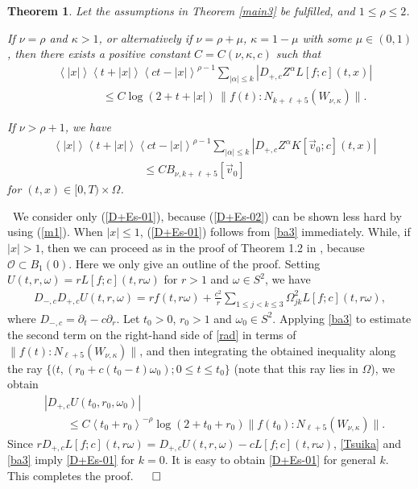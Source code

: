 \documentclass[12pt]{amsart}
\newcommand{\pa}{\partial}
\newcommand{\jb}[1]{\left\langle #1 \right\rangle}
\newcommand{\norm}[2]{\|#1 \!:\! #2\|}
\newtheorem{theorem}{Theorem}[section]
\numberwithin{equation}{section}
\begin{document}
\vspace{2mm}


\begin{theorem}\label{D+Es}
Let the assumptions in Theorem {\rm \ref{main3}} be fulfilled,
and $1\le \rho\le 2$. 

If $\nu=\rho$ and $\kappa>1$, or
alternatively if $\nu=\rho+\mu$, $\kappa=1-\mu$ with some $\mu\in (0,1)$,
then there exists a positive constant $C=C(\nu,\kappa,c)$ such that
\begin{align}
\label{D+Es-01}
& \jb{|x|} \jb{t+|x|} \jb{ct-|x|}^{\rho-1} 
\sum_{|\alpha|\le k} |D_{+,c}Z^\alpha L[f;c](t,x)|
\\
& \qquad\qquad \le C \log(2+t+|x|)\,\|f(t)\!:\!{N_{k+\ell+5}(W_{\nu,\kappa})}\|.
\nonumber
\end{align}

If $\nu>\rho+1$, we have
\begin{align}
\label{D+Es-02}
& \jb{|x|} \jb{t+|x|} \jb{ct-|x|}^{\rho-1} 
\sum_{|\alpha|\le k} |D_{+,c}Z^\alpha K[\vec{v}_0;c](t,x)|
\\
\nonumber
& \qquad\qquad\qquad\qquad \le C B_{\nu, k+\ell+5}[\vec{v}_0]
\end{align}
for $(t,x)\in [0,T)\times \Omega$.
\end{theorem}
\ 
We consider only (\ref{D+Es-01}), because (\ref{D+Es-02}) can be shown
less hard by using (\ref{m1}).
When $|x| \le 1$, (\ref{D+Es-01}) follows from %
\eqref{ba3} immediately.
While, if $|x|>1$, then we can proceed as in the proof of Theorem 1.2 in \cite{KaKu07},
because ${\mathcal O} \subset B_1(0)$. Here we only give an outline
of the proof.
Setting $U(t, r, \omega)=rL[f; c](t, r\omega)$ for $r>1$ and $\omega\in S^2$,
we have
\begin{align}
 D_{-,c}D_{+,c} U(t,r,\omega)=rf(t,r\omega)
 {}+\frac{c^2}{r}\sum_{1\le j<k\le 3} \Omega_{jk}^2 L[f;c](t, r\omega),
 \label{rad}
\end{align}
where $D_{-,c}=\pa_t-c\pa_r$.
Let $t_0>0$, $r_0>1$ and $\omega_0\in S^2$.
Applying \eqref{ba3} to estimate the second term on 
the right-hand side of \eqref{rad} in terms of 
$\norm{f(t)}{N_{\ell+5}(W_{\nu, \kappa})}$, 
and then integrating the obtained inequality 
along the ray $\{(t, (r_0+c(t_0-t)\omega_0); 0\le t\le t_0\}$
(note that this ray lies in $\Omega$),
we obtain
\begin{align}
\label{Tsuika}
& |D_{+,c}U(t_0, r_0, \omega_0)|\\
& \qquad \le C\jb{t_0+r_0}^{-\rho}\log(2+t_0+r_0)
\norm{f(t_0)}{N_{\ell+5}(W_{\nu, \kappa})}.
\nonumber
\end{align}
Since $rD_{+,c}L[f;c](t, r\omega)=D_{+, c}U(t, r, \omega)-cL[f;c](t, r\omega)$,
\eqref{Tsuika} and \eqref{ba3} imply \eqref{D+Es-01} for $k=0$.
It is easy to obtain \eqref{D+Es-01} for general $k$.
This completes the proof.
\hfill$\qed$
\end{document}

